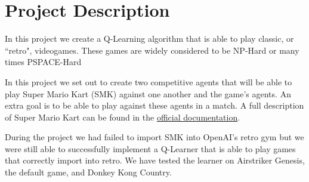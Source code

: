 \section{Project Description}
In this project we create a Q-Learning algorithm that is able to play classic,
or ``retro", videogames. These games are widely considered to be NP-Hard or
many times PSPACE-Hard\cite{DBLP}

In this project we set out to create two competitive agents that will be able to
play Super Mario Kart (SMK) against one another and the game's agents. An 
extra goal is to be able to play against these agents in a match. A full 
description of Super Mario Kart can be found in the 
\href{https://www.nintendo.co.jp/clvs/manuals/common/pdf/CLV-P-SAAFE.pdf}
{official documentation}.

During the project we had failed to import SMK into OpenAI's retro gym but we
were still able to successfully implement a Q-Learner that is able to play 
games that correctly import into retro. We have tested the learner on
Airstriker Genesis, the default game, and Donkey Kong Country. 
